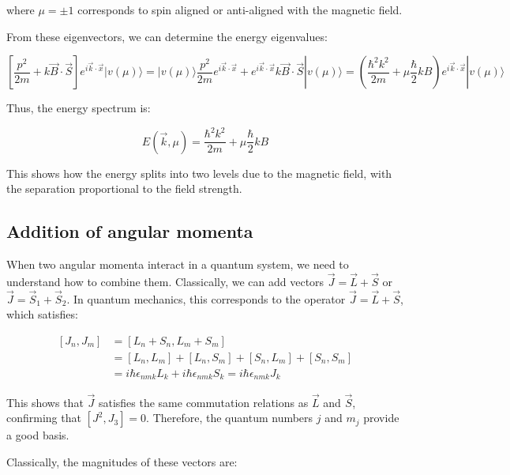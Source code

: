 \documentclass[italian]{HKNdocument}
\begin{document}
where $\mu = \pm 1$ corresponds to spin aligned or anti-aligned with the magnetic field.


From these eigenvectors, we can determine the energy eigenvalues:

\begin{equation}
\left[\frac{p^{2}}{2 m}+k \vec{B} \cdot \vec{S}\right] e^{i \vec{k} \cdot \vec{x}}|v(\mu)\rangle=|v(\mu)\rangle \frac{p^{2}}{2 m} e^{i \vec{k} \cdot \vec{x}}+e^{i \vec{k} \cdot \vec{x}} k \vec{B} \cdot \vec{S}|v(\mu)\rangle=\left(\frac{\hbar^{2} k^{2}}{2 m}+\mu \frac{\hbar}{2} k B\right) e^{i \vec{k} \cdot \vec{x}}|v(\mu)\rangle \label{eq:11.34}
\end{equation}

Thus, the energy spectrum is:

\begin{equation}
E(\vec{k}, \mu)=\frac{\hbar^{2} k^{2}}{2 m}+\mu \frac{\hbar}{2} k B \label{eq:11.35}
\end{equation}

This shows how the energy splits into two levels due to the magnetic field, with the separation proportional to the field strength.

\subsection{Addition of angular momenta}
When two angular momenta interact in a quantum system, we need to understand how to combine them. Classically, we can add vectors $\vec{J}=\vec{L}+\vec{S}$ or $\vec{J}=\vec{S}_1+\vec{S}_2$. In quantum mechanics, this corresponds to the operator $\vec{J}=\vec{L}+\vec{S}$, which satisfies:

\begin{align}
\left[J_{n}, J_{m}\right] &= \left[L_{n}+S_{n}, L_{m}+S_{m}\right]\\
&= \left[L_{n}, L_{m}\right]+\left[L_{n}, S_{m}\right]+\left[S_{n}, L_{m}\right]+\left[S_{n}, S_{m}\right]\\
&= i \hbar \epsilon_{n m k} L_{k}+i \hbar \epsilon_{n m k} S_{k}=i \hbar \epsilon_{n m k} J_{k} \label{eq:11.36}
\end{align}

This shows that $\vec{J}$ satisfies the same commutation relations as $\vec{L}$ and $\vec{S}$, confirming that $\left[J^{2}, J_{3}\right]=0$. Therefore, the quantum numbers $j$ and $m_j$ provide a good basis.

Classically, the magnitudes of these vectors are:
\end{document}
